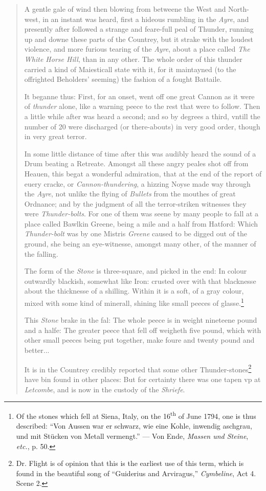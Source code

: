 \documentclass[a4paper, 12pt, oneside, polutonikogreek, english]{article}
\begin{document}
\begin{quotation}
A gentle gale of wind then blowing from betweene the West and North-west, in an instant was heard, first a hideous rumbling in the \emph{Ayre}, and presently after followed a strange and feare-full peal of Thunder, running up and downe these parts of the Countrey, but it strake with the loudest violence, and more furious tearing of the \emph{Ayre}, about a place called \emph{The White Horse Hill}, than in any other. The whole order of this thunder carried a kind of Maiesticall state with it, for it maintayned (to the offrighted Beholders' seeming) the fashion of a fought Battaile.

It beganne thus: First, for an onset, went off one great Cannon as it were of \emph{thunder} alone, like a warning peece to the rest that were to follow. Then a little while after was heard a second; and so by degrees a third, vntill the number of 20 were discharged (or there-abouts) in very good order, though in very great terror.

In some little distance of time after this was audibly heard the sound of a Drum beating a Retreate. Amongst all these angry peales shot off from Heauen, this begat a wonderful admiration, that at the end of the report of euery cracke, or \emph{Cannon-thundering}, a hizzing Noyse made way through the \emph{Ayre}, not unlike the flying of \emph{Bullets} from the mouthes of great Ordnance; and by the judgment of all the terror-striken witnesses they were \emph{Thunder-bolts}. For one of them was seene by many people to fall at a place called Bawlkin Greene, being a mile and a half from Hatford: Which \emph{Thunder-bolt} was by one Mistris \emph{Greene} caused to be digged out of the ground, she being an eye-witnesse, amongst many other, of the manner of the falling.

The form of the \emph{Stone} is three-square, and picked in the end: In colour outwardly blackish, somewhat like Iron: crusted over with that blacknesse about the thicknesse of a shilling. Within it is a soft, of a gray colour, mixed with some kind of minerall, shining like small peeces of glasse.\footnote{Of the stones which fell at Siena, Italy, on the 16\textsuperscript{th} of June 1794, one is thus described: ``Von Aussen war er schwarz, wie eine Kohle, inwendig aschgrau, und mit Stücken von Metall vermengt.'' --- Von Ende, \emph{Massen und Steine}, \emph{etc.}, p. 50.}

This \emph{Stone} brake in the fal: The whole peece is in weight nineteene pound and a halfe: The greater peece that fell off weigheth five pound, which with other small peeces being put together, make foure and twenty pound and better...

It is in the Countrey credibly reported that some other Thunder-stones\footnote{Dr. Flight is of opinion that this is the earliest use of this term, which is found in the beautiful song of ``Guiderius and Arviragus,'' \emph{Cymbeline}, Act 4. Scene 2.} have bin found in other places: But for certainty there was one tapen vp at \emph{Letcombe}, and is now in the custody of the \emph{Shriefe}.
\end{quotation}
\end{document}
